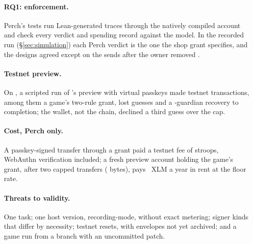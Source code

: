 \paragraph{RQ1: enforcement.} Perch's tests run 
Lean-generated traces through the natively compiled account and check every
verdict and spending record against the model. In the recorded run
(\S\ref{sec:simulation}) each Perch verdict is the one the shop grant
specifies, and the designs agreed except on the 
sends after the owner removed .

\paragraph{Testnet preview.} On , a scripted run of
's preview with virtual passkeys made
 testnet transactions, among them a game's two-rule
grant,  lost guesses and a
-guardian recovery to completion; the wallet,
not the chain, declined a third guess over the cap.

\paragraph{Cost, Perch only.} A passkey-signed transfer through a grant paid a
testnet fee of  stroops, WebAuthn verification included;
a fresh preview account holding the game's grant, after two capped transfers
( bytes), pays ~XLM a year in rent
at the floor rate.

\paragraph{Threats to validity.} One task; one host version, recording-mode, without
exact metering; signer kinds that differ by necessity; testnet resets, with
envelopes not yet archived; and a game run from a branch with an uncommitted
patch.
